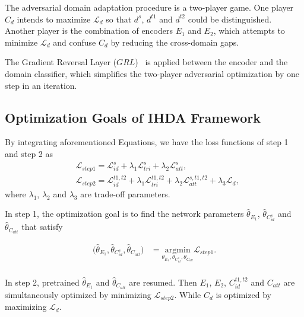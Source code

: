 \documentclass[journal]{IEEEtran}
\begin{document}
The adversarial domain adaptation procedure is a two-player game. One player $C_{d}$ intends to maximize $\mathcal{L}_{d}$ so that $d^{s}$, $d^{t1}$ and $d^{t2}$ could be distinguished. Another player is the combination of encoders $E_{1}$ and $E_{2}$, which attempts to minimize $\mathcal{L}_{d}$ and confuse $C_{d}$ by reducing the cross-domain gaps.

The Gradient Reversal Layer ($GRL$)~\cite{ganin2015unsupervised} is applied between the encoder and the domain classifier, which simplifies the two-player adversarial optimization by one step in an iteration.

\subsection{Optimization Goals of IHDA Framework}
By integrating aforementioned Equations, we have the loss functions of step 1 and step 2 as
\begin{equation}
\begin{split}
&\mathcal{L}_{step1} = \mathcal{L}^{s}_{id} + \lambda_1 \mathcal{L}^{s}_{tri} + \lambda_2 \mathcal{L}^{s}_{att},\\
&\mathcal{L}_{step2} = \mathcal{L}^{t1,t2}_{id} + \lambda_1 \mathcal{L}^{t1,t2}_{tri} + \lambda_2 \mathcal{L}^{s,t1,t2}_{att} + \lambda_3 \mathcal{L}_{d},
\end{split}
\label{eq:opt_goal}
\end{equation}
where $\lambda_1$, $\lambda_2$ and $\lambda_3$ are trade-off parameters.

In step 1, the optimization goal is to find the network parameters $\hat{\theta }_{E_{1}}$, $\hat{\theta }_{C^{s}_{id}}$ and $\hat{\theta }_{C_{att}}$ that satisfy

\begin{equation}
\begin{split}
\big( \hat{\theta }_{E_{1}}, \hat{\theta}_{C^{s}_{id}}, \hat{\theta}_{C_{att}} \big) 
&= \underset{\theta_{E_{1}},\theta_{C^{s}_{id}},\theta_{C_{att}}}{\mathrm{argmin}} \mathcal{L}_{step1}.\\
\end{split}
\end{equation}


In step 2, pretrained $\hat{\theta }_{E_{1}}$ and $\hat{\theta}_{C_{att}}$ are resumed. Then $E_{1}$, $E_{2}$, $C^{t1,t2}_{id}$ and $C_{att}$ are simultaneously optimized by minimizing $\mathcal{L}_{step2}$. While $C_{d}$ is optimized by maximizing $\mathcal{L}_{d}$.
\end{document}
